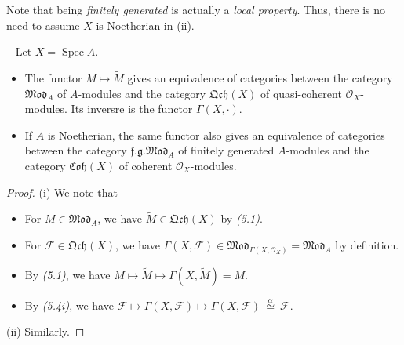 \documentclass[11pt,a4paper,footinclude=true,headinclude=true]{scrbook} %
\DeclareMathOperator{\Spec}{Spec}
\newcommand{\FF}{\mathscr{F}}
\newcommand{\OO}{\mathcal{O}}
\newcommand{\<}{\langle}
\newcommand{\>}{\rangle}
\newcommand{\fg}{\mathfrak{f.g.}}
\newcommand{\MOD}{\mathfrak{Mod}}
\newcommand{\qcoh}{\mathfrak{Qch}}
\newcommand{\coh}{\mathfrak{Coh}}
\newenvironment{corollary}[2][]
{\renewcommand\theinnercustomcol{#2}\innercustomcol[#1]
\begin{mdframed}[backgroundcolor=gray!20]\ }
{\end{mdframed}\endinnercustomcol}
\newenvironment{remark*}[2][Remark]
    { \begin{mdframed}[backgroundcolor=gray!20] \textbf{#1.}\ }
    {  \end{mdframed}}
\begin{document}
\begin{remark*}{}
    Note that being \textit{finitely generated} is actually a \textit{local property}. Thus, there is no need to assume $X$ is Noetherian in (ii).
\end{remark*}    

\begin{corollary}{5.5}
    Let $X=\Spec A$.
    \begin{itemize}
        \item[(i)] The functor $M\mapsto\widetilde{M}$ gives an equivalence of categories between the category $\MOD_A$ of $A$-modules and the category $\qcoh(X)$ of quasi-coherent $\OO_X$-modules. Its inversre is the functor $\Gamma(X,\cdot)$.
        \item[(ii)] If $A$ is Noetherian, the same functor also gives an equivalence of categories between the category $\fg\MOD_A$ of finitely generated $A$-modules and the category $\coh(X)$ of coherent $\OO_X$-modules.
    \end{itemize}
\end{corollary}
\begin{proof}
    (i) We note that
    \begin{itemize}
        \item For $M\in\MOD_A$, we have $\widetilde{M}\in\qcoh(X)$ by \textit{(5.1)}.
        \item For $\FF\in\qcoh(X)$, we have $\Gamma(X,\FF)\in\MOD_{\Gamma(X,\OO_X)}=\MOD_A$ by definition.
        \item By \textit{(5.1)}, we have $M\longmapsto\widetilde{M}\longmapsto\Gamma(X,\widetilde{M})=M$.
        \item By \textit{(5.4i)}, we have $\FF\longmapsto\Gamma(X,\FF)\longmapsto\Gamma(X,\FF)\widetilde{}\ \overset{\alpha}{\simeq}\ \FF$.
    \end{itemize}
    (ii) Similarly.
\end{proof}
\end{document}

